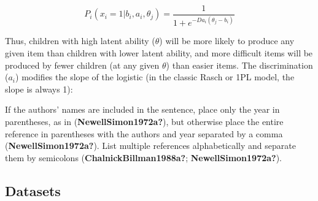 \documentclass[10pt, letterpaper]{article}
\begin{document}
\[P_{i}(x_i = 1 | b_{i},a_{i},\theta_j ) = \frac{1}{1 + e^{-D a_{i}(\theta_j - b_i )}}\]

Thus, children with high latent ability (\(\theta\)) will be more likely
to produce any given item than children with lower latent ability, and
more difficult items will be produced by fewer children (at any given
\(\theta\)) than easier items. The discrimination (\(a_i\)) modifies the
slope of the logistic (in the classic Rasch or 1PL model, the slope is
always 1):

If the authors' names are included in the sentence, place only the year
in parentheses, as in (\textbf{NewellSimon1972a?}), but otherwise place
the entire reference in parentheses with the authors and year separated
by a comma (\textbf{NewellSimon1972a?}). List multiple references
alphabetically and separate them by semicolons
(\textbf{ChalnickBillman1988a?}; \textbf{NewellSimon1972a?}).

\hypertarget{datasets}{%
\subsection{Datasets}\label{datasets}}
\end{document}
